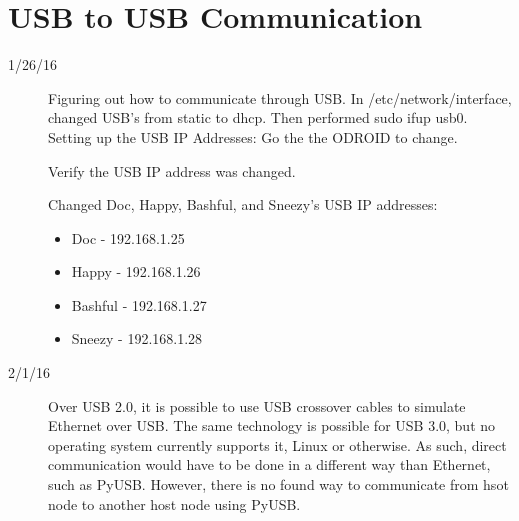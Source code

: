 \section{USB to USB Communication}
\begin{description}
\item [1/26/16] Figuring out how to communicate through USB. In /etc/network/interface, changed USB's from static to dhcp. Then performed sudo ifup usb0.
Setting up the USB IP Addresses:
Go the the ODROID to change.




Verify the USB IP address was changed.

Changed Doc, Happy, Bashful, and Sneezy's USB IP addresses:
	\begin{itemize}
		\item Doc - 192.168.1.25
		\item Happy - 192.168.1.26
		\item Bashful - 192.168.1.27
		\item Sneezy - 192.168.1.28
	\end{itemize}
\item[2/1/16] Over USB 2.0, it is possible to use USB crossover cables to simulate Ethernet over USB. The same technology is possible for USB 3.0, but no operating system currently supports it, Linux or otherwise. As such, direct communication would have to be done in a different way than Ethernet, such as PyUSB. However, there is no found way to communicate from hsot node to another host node using PyUSB.
\end{description}

